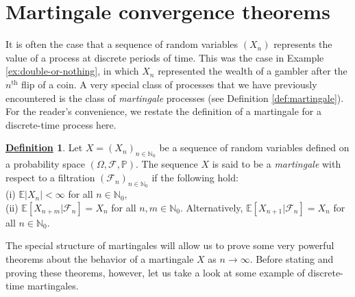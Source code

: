 \documentclass[12pt]{book}
\numberwithin{equation}{chapter}
\theoremstyle{plain}
\numberwithin{theorem}{section}
\theoremstyle{definition}
\newtheorem{definition}[theorem]{\underline{Definition}}
\numberwithin{exercise}{chapter}
\newcommand{\<}{\langle}
\renewcommand{\>}{\rangle}
\renewcommand{\(}{\left(}
\renewcommand{\)}{\right)}
\renewcommand{\[}{\left[}
\renewcommand{\]}{\right]}
\newcommand\Eb{\mathds{E}}
\newcommand\Pb{\mathds{P}}
\newcommand\Nb{\mathds{N}}
\newcommand\Fc{\mathscr{F}}
\newcommand\Om{\Omega}
\begin{document}

\section{Martingale convergence theorems}
\label{sec:martingale.convergence}
It is often the case that a sequence of random variables $(X_n)$ represents the value of a process at discrete periods of time.  This was the case in Example \ref{ex:double-or-nothing}, in which $X_n$ represented the wealth of a gambler after the $n^\text{th}$ flip of a coin.  A very special class of processes that we have previously encountered is the class of \emph{martingale} processes (see Definition \ref{def:martingale}).  For the reader's convenience, we restate the definition of a martingale for a discrete-time process here.

\begin{definition}
\label{def:martingale.2}
Let $X=(X_n)_{n \in \Nb_0}$ be a sequence of random variables defined on a probability space $(\Om,\Fc,\Pb)$.  The sequence $X$ is said to be a \emph{martingale} with respect to a filtration $(\Fc_n)_{n \in \Nb_0}$ if the following hold:\\
(i) $\Eb |X_n| < \infty$ for all $n \in \Nb_0$,\\
(ii) $\Eb[ X_{n+m} | \Fc_n ] = X_n$ for all $n,m \in \Nb_0$.  Alternatively, $\Eb[ X_{n+1} | \Fc_n ] = X_n$ for all $n \in \Nb_0$.
\end{definition}

\noindent
The special structure of martingales will allow us to prove some very powerful theorems about the behavior of a martingale $X$ as $n \to \infty$.  Before stating and proving these theorems, however, let us take a look at some example of discrete-time martingales.
\end{document}
